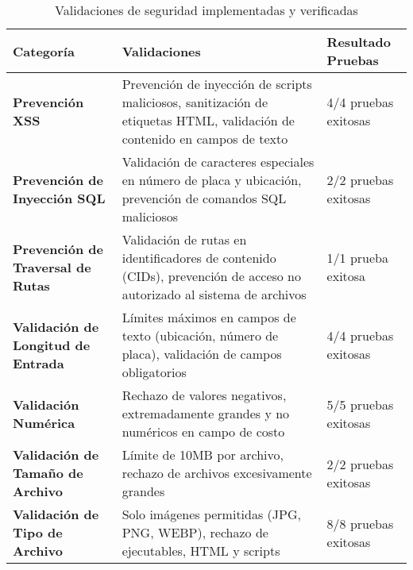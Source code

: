 \begin{table}[htbp]
\centering
\caption{Validaciones de seguridad implementadas y verificadas}
\label{tab:validaciones_seguridad}
\begin{adjustbox}{max width=\textwidth}
\begin{tabular}{@{}lp{6cm}p{5cm}@{}}
\toprule
\textbf{Categoría} & \textbf{Validaciones} & \textbf{Resultado Pruebas} \\
\midrule

\textbf{Prevención XSS} &
Prevención de inyección de scripts maliciosos, sanitización de etiquetas HTML, validación de contenido en campos de texto &
4/4 pruebas exitosas \\
\addlinespace

\textbf{Prevención de Inyección SQL} &
Validación de caracteres especiales en número de placa y ubicación, prevención de comandos SQL maliciosos &
2/2 pruebas exitosas \\
\addlinespace

\textbf{Prevención de Traversal de Rutas} &
Validación de rutas en identificadores de contenido (CIDs), prevención de acceso no autorizado al sistema de archivos &
1/1 prueba exitosa \\
\addlinespace

\textbf{Validación de Longitud de Entrada} &
Límites máximos en campos de texto (ubicación, número de placa), validación de campos obligatorios &
4/4 pruebas exitosas \\
\addlinespace

\textbf{Validación Numérica} &
Rechazo de valores negativos, extremadamente grandes y no numéricos en campo de costo &
5/5 pruebas exitosas \\
\addlinespace

\textbf{Validación de Tamaño de Archivo} &
Límite de 10MB por archivo, rechazo de archivos excesivamente grandes &
2/2 pruebas exitosas \\
\addlinespace

\textbf{Validación de Tipo de Archivo} &
Solo imágenes permitidas (JPG, PNG, WEBP), rechazo de ejecutables, HTML y scripts &
8/8 pruebas exitosas \\

\bottomrule
\end{tabular}
\end{adjustbox}
\end{table}
